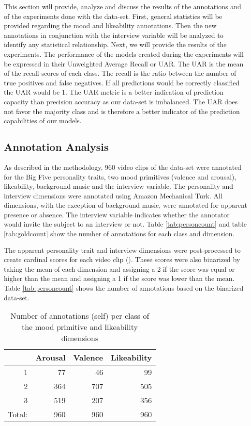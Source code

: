 This section will provide, analyze and discuss the results of the annotations and of the experiments done with the data-set. First, general statistics will be provided regarding the mood and likeability annotations. Then the new annotations in conjunction with the interview variable will be analyzed to identify any statistical relationship. Next, we will provide the results of the experiments. The performance of the models created during the experiments will be expressed in their Unweighted Average Recall or UAR. The UAR is the mean of the recall scores of each class. The recall is the ratio between the number of true positives and false negatives. If all predictions would be correctly classified the UAR would be 1. The UAR metric  is a better indication of prediction capacity than precision accuracy as our data-set is imbalanced. The UAR does not favor the majority class and is therefore a better indicator of the prediction capabilities of our models.
\break

\subsection{Annotation Analysis}
As described in the methodology, 960 video clips of the data-set were annotated for the Big Five personality traits, two mood primitives (valence and arousal), likeability, background music and the interview variable. The personality and interview dimensions were annotated using Amazon Mechanical Turk. All dimensions, with the exception of background music, were annotated for apparent presence or absence. The interview variable indicates whether the annotator would invite the subject to an interview or not. Table \ref{tab:personcount} and table \ref{tab:goldcount} show the number of annotations for each class and dimension. 

The apparent personality trait and interview dimensions were post-processed to create cardinal scores for each video clip (\cite{escalante2018explaining}). These scores were also binarized by taking the mean of each dimension and assigning a 2 if the score was equal or higher than the mean and assigning a 1 if the score was lower than the mean. Table \ref{tab:personcount} shows the number of annotations based on the binarized data-set. 

\begin{table}[h]
\begin{tabular}{|r|r|r|r|}
\hline
\rowcolor{Gray} 
\multicolumn{1}{|l|}{Class} &
  \multicolumn{1}{l|}{Arousal} &
  \multicolumn{1}{l|}{Valence} &
  \multicolumn{1}{l|}{Likeability} \\ \hline
1                           & 77  & 46  & 99  \\ \hline
2                           & 364 & 707 & 505 \\ \hline
3                           & 519 & 207 & 356 \\ \hline
\multicolumn{1}{|l|}{Total:} & 960 & 960 & 960 \\ \hline
\end{tabular}
\caption{Number of annotations (self) per class of the mood primitive and likeability dimensions}
\label{tab:selfcount}
\end{table}

